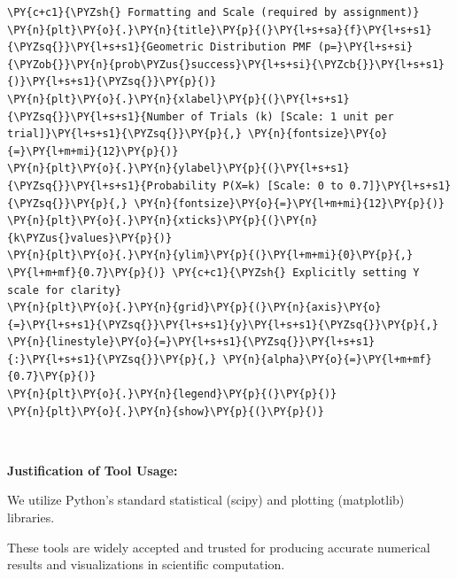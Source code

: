 \begin{tcolorbox}[breakable, size=fbox, boxrule=1pt, pad at break*=1mm,colback=cellbackground, colframe=cellborder]
\begin{Verbatim}[commandchars=\\\{\}]
\PY{c+c1}{\PYZsh{} Formatting and Scale (required by assignment)}
\PY{n}{plt}\PY{o}{.}\PY{n}{title}\PY{p}{(}\PY{l+s+sa}{f}\PY{l+s+s1}{\PYZsq{}}\PY{l+s+s1}{Geometric Distribution PMF (p=}\PY{l+s+si}{\PYZob{}}\PY{n}{prob\PYZus{}success}\PY{l+s+si}{\PYZcb{}}\PY{l+s+s1}{)}\PY{l+s+s1}{\PYZsq{}}\PY{p}{)}
\PY{n}{plt}\PY{o}{.}\PY{n}{xlabel}\PY{p}{(}\PY{l+s+s1}{\PYZsq{}}\PY{l+s+s1}{Number of Trials (k) [Scale: 1 unit per trial]}\PY{l+s+s1}{\PYZsq{}}\PY{p}{,} \PY{n}{fontsize}\PY{o}{=}\PY{l+m+mi}{12}\PY{p}{)}
\PY{n}{plt}\PY{o}{.}\PY{n}{ylabel}\PY{p}{(}\PY{l+s+s1}{\PYZsq{}}\PY{l+s+s1}{Probability P(X=k) [Scale: 0 to 0.7]}\PY{l+s+s1}{\PYZsq{}}\PY{p}{,} \PY{n}{fontsize}\PY{o}{=}\PY{l+m+mi}{12}\PY{p}{)}
\PY{n}{plt}\PY{o}{.}\PY{n}{xticks}\PY{p}{(}\PY{n}{k\PYZus{}values}\PY{p}{)}
\PY{n}{plt}\PY{o}{.}\PY{n}{ylim}\PY{p}{(}\PY{l+m+mi}{0}\PY{p}{,} \PY{l+m+mf}{0.7}\PY{p}{)} \PY{c+c1}{\PYZsh{} Explicitly setting Y scale for clarity}
\PY{n}{plt}\PY{o}{.}\PY{n}{grid}\PY{p}{(}\PY{n}{axis}\PY{o}{=}\PY{l+s+s1}{\PYZsq{}}\PY{l+s+s1}{y}\PY{l+s+s1}{\PYZsq{}}\PY{p}{,} \PY{n}{linestyle}\PY{o}{=}\PY{l+s+s1}{\PYZsq{}}\PY{l+s+s1}{:}\PY{l+s+s1}{\PYZsq{}}\PY{p}{,} \PY{n}{alpha}\PY{o}{=}\PY{l+m+mf}{0.7}\PY{p}{)}
\PY{n}{plt}\PY{o}{.}\PY{n}{legend}\PY{p}{(}\PY{p}{)}
\PY{n}{plt}\PY{o}{.}\PY{n}{show}\PY{p}{(}\PY{p}{)}
\end{Verbatim}
\end{tcolorbox}

    \begin{center}
    \end{center}
    { \hspace*{\fill} \\}
    
    \textbf{Justification of Tool Usage:}

We utilize Python's standard statistical (scipy) and plotting
(matplotlib) libraries.

These tools are widely accepted and trusted for producing accurate
numerical results and visualizations in scientific computation.


    
    
    
